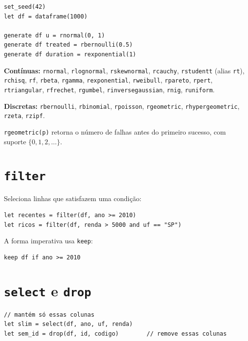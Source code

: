 \begin{lstlisting}[caption={Simulando dados}]
set_seed(42)
let df = dataframe(1000)

generate df u = rnormal(0, 1)
generate df treated = rbernoulli(0.5)
generate df duration = rexponential(1)
\end{lstlisting}

\textbf{Contínuas:} \lstinline{rnormal}, \lstinline{rlognormal}, \lstinline{rskewnormal}, \lstinline{rcauchy}, \lstinline{rstudentt} (alias \lstinline{rt}), \lstinline{rchisq}, \lstinline{rf}, \lstinline{rbeta}, \lstinline{rgamma}, \lstinline{rexponential}, \lstinline{rweibull}, \lstinline{rpareto}, \lstinline{rpert}, \lstinline{rtriangular}, \lstinline{rfrechet}, \lstinline{rgumbel}, \lstinline{rinversegaussian}, \lstinline{rnig}, \lstinline{runiform}.

\textbf{Discretas:} \lstinline{rbernoulli}, \lstinline{rbinomial}, \lstinline{rpoisson}, \lstinline{rgeometric}, \lstinline{rhypergeometric}, \lstinline{rzeta}, \lstinline{rzipf}.

\begin{nota}
  \lstinline{rgeometric(p)} retorna o número de falhas antes do primeiro
  sucesso, com suporte $\{0, 1, 2, \ldots\}$.
\end{nota}

\section{\texttt{filter}}

Seleciona linhas que satisfazem uma condição:

\begin{lstlisting}
let recentes = filter(df, ano >= 2010)
let ricos = filter(df, renda > 5000 and uf == "SP")
\end{lstlisting}

A forma imperativa usa \lstinline{keep}:

\begin{lstlisting}
keep df if ano >= 2010
\end{lstlisting}

\section{\texttt{select} e \texttt{drop}}

\begin{lstlisting}
// mantém só essas colunas
let slim = select(df, ano, uf, renda)
let sem_id = drop(df, id, codigo)        // remove essas colunas
\end{lstlisting}

